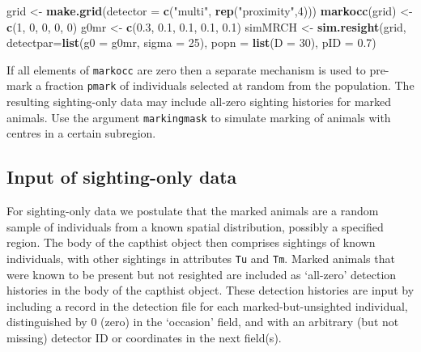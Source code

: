 \documentclass[
]{book}
\newenvironment{Shaded}{\begin{snugshade}}{\end{snugshade}}
\newcommand{\AttributeTok}[1]{\textcolor[rgb]{0.13,0.29,0.53}{#1}}
\newcommand{\DecValTok}[1]{\textcolor[rgb]{0.00,0.00,0.81}{#1}}
\newcommand{\FloatTok}[1]{\textcolor[rgb]{0.00,0.00,0.81}{#1}}
\newcommand{\FunctionTok}[1]{\textcolor[rgb]{0.13,0.29,0.53}{\textbf{#1}}}
\newcommand{\NormalTok}[1]{#1}
\newcommand{\OtherTok}[1]{\textcolor[rgb]{0.56,0.35,0.01}{#1}}
\newcommand{\StringTok}[1]{\textcolor[rgb]{0.31,0.60,0.02}{#1}}
\begin{document}
\begin{Shaded}
\begin{Highlighting}[]
\NormalTok{grid }\OtherTok{\textless{}{-}} \FunctionTok{make.grid}\NormalTok{(}\AttributeTok{detector =} \FunctionTok{c}\NormalTok{(}\StringTok{"multi"}\NormalTok{, }\FunctionTok{rep}\NormalTok{(}\StringTok{"proximity"}\NormalTok{,}\DecValTok{4}\NormalTok{)))}
\FunctionTok{markocc}\NormalTok{(grid) }\OtherTok{\textless{}{-}} \FunctionTok{c}\NormalTok{(}\DecValTok{1}\NormalTok{, }\DecValTok{0}\NormalTok{, }\DecValTok{0}\NormalTok{, }\DecValTok{0}\NormalTok{, }\DecValTok{0}\NormalTok{)}
\NormalTok{g0mr }\OtherTok{\textless{}{-}} \FunctionTok{c}\NormalTok{(}\FloatTok{0.3}\NormalTok{, }\FloatTok{0.1}\NormalTok{, }\FloatTok{0.1}\NormalTok{, }\FloatTok{0.1}\NormalTok{, }\FloatTok{0.1}\NormalTok{)}
\NormalTok{simMRCH }\OtherTok{\textless{}{-}} \FunctionTok{sim.resight}\NormalTok{(grid, }\AttributeTok{detectpar=}\FunctionTok{list}\NormalTok{(}\AttributeTok{g0 =}\NormalTok{ g0mr, }\AttributeTok{sigma =} \DecValTok{25}\NormalTok{),  }
    \AttributeTok{popn =} \FunctionTok{list}\NormalTok{(}\AttributeTok{D =} \DecValTok{30}\NormalTok{), }\AttributeTok{pID =} \FloatTok{0.7}\NormalTok{)}
\end{Highlighting}
\end{Shaded}

If all elements of \texttt{markocc} are zero then a separate mechanism is used to pre-mark a fraction \texttt{pmark} of individuals selected at random from the population. The resulting sighting-only data may include all-zero sighting histories for marked animals. Use the argument \texttt{markingmask} to simulate marking of animals with centres in a certain subregion.

\subsection{Input of sighting-only data}\label{input-of-sighting-only-data}

For sighting-only data we postulate that the marked animals are a random sample of individuals from a known spatial distribution, possibly a specified region. The body of the capthist object then comprises sightings of known individuals, with other sightings in attributes \texttt{Tu} and \texttt{Tm}. Marked animals that were known to be present but not resighted are included as `all-zero' detection histories in the body of the capthist object. These detection histories are input by including a record in the detection file for each marked-but-unsighted individual, distinguished by 0 (zero) in the `occasion' field, and with an arbitrary (but not missing) detector ID or coordinates in the next field(s).
\end{document}
